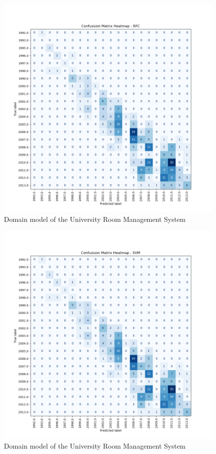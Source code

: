 \documentclass[conference,onecolumn]{IEEEtran}
\begin{document}
    \begin{figure}[H]
		\centering
		\includegraphics[width=1\textwidth]{Plots/CM_Heatmap_RFC.png}
		\caption{Domain model of the University Room Management System}
		\label{appx:cmheatmaprfc}
	\end{figure}
    \begin{figure}[H]
		\centering
		\includegraphics[width=1\textwidth]{Plots/CM_Heatmap_SVM.png}
		\caption{Domain model of the University Room Management System}
		\label{appx:cmheatmapsvm}
	\end{figure}
\end{document}
